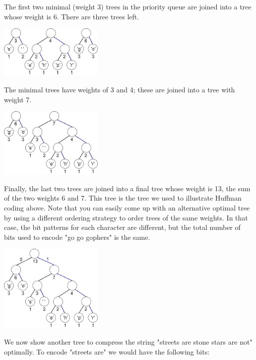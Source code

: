 \documentclass[11pt]{article}
\begin{document}
The first two minimal (weight 3) trees in the priority queue are
joined into a tree whose weight is 6.  There are three trees left.

\begin{center}
  \includegraphics[width=5cm]{figures/ngopher6}
\end{center}

The minimal trees have weights of 3 and 4; these are joined into a
tree with weight 7.

\begin{center}
  \includegraphics[width=5cm]{figures/ngopher7}
\end{center}

Finally, the last two trees are joined into a final tree whose weight
is 13, the sum of the two weights 6 and 7.  This tree is the tree we
used to illustrate Huffman coding above.  Note that you can easily
come up with an alternative optimal tree by using a different ordering
strategy to order trees of the same weights.  In that case, the bit
patterns for each character are different, but the total number of
bits used to encode "go go gophers" is the same.

\begin{center}
  \includegraphics[width=5cm]{figures/ngopher8}
\end{center}

We now show another tree to compress the string "streets are stone
stars are not" optimally.  To encode "streets are" we would have the
following bits:
\end{document}
